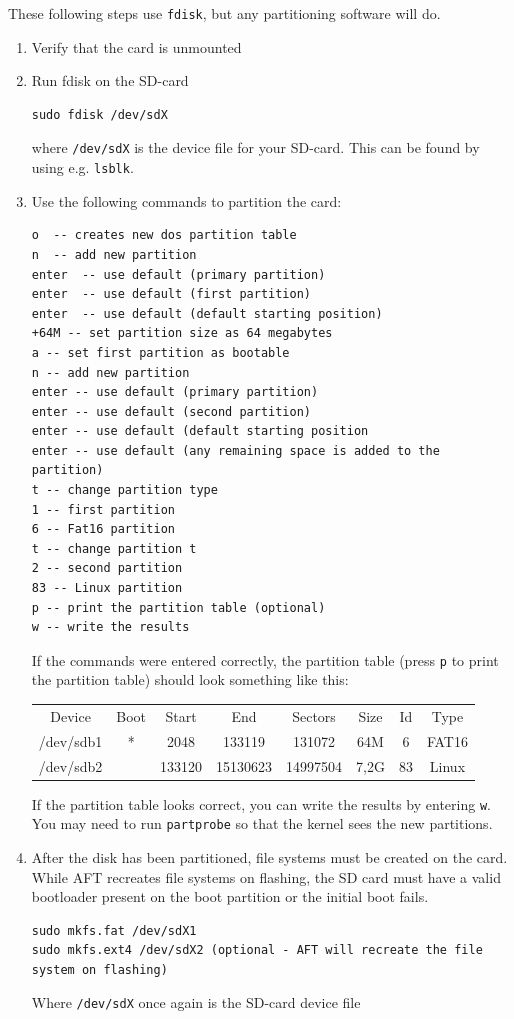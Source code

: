 \documentclass[a4paper,11pt]{article}
\newcommand{\cmd}[1]{\texttt{#1}}
\begin{document}
These following steps use \cmd{fdisk}, but any partitioning software will do.

\begin{enumerate}

\item Verify that the card is unmounted

\item Run fdisk on the SD-card

\begin{lstlisting}
sudo fdisk /dev/sdX
\end{lstlisting} 

where \cmd{/dev/sdX} is the device file for your SD-card. This can be found by using e.g. \cmd{lsblk}.

\item Use the following commands to partition the card:

\begin{lstlisting}
o  -- creates new dos partition table
n  -- add new partition
enter  -- use default (primary partition)
enter  -- use default (first partition)
enter  -- use default (default starting position)
+64M -- set partition size as 64 megabytes
a -- set first partition as bootable
n -- add new partition
enter -- use default (primary partition)
enter -- use default (second partition)
enter -- use default (default starting position
enter -- use default (any remaining space is added to the partition)
t -- change partition type
1 -- first partition 
6 -- Fat16 partition
t -- change partition t
2 -- second partition 
83 -- Linux partition
p -- print the partition table (optional)
w -- write the results
\end{lstlisting}

If the commands were entered correctly, the partition table (press \cmd{p} to print the partition table) should look something like this:

\begin{tabular}{c c c c c c c c}
Device & Boot & Start & End & Sectors & Size & Id & Type \\
/dev/sdb1  & * & 2048 & 133119 & 131072 & 64M & 6 & FAT16 \\
/dev/sdb2  &   & 133120 & 15130623 & 14997504 & 7,2G & 83 & Linux \\
\end{tabular}

If the partition table looks correct, you can write the results by entering \cmd{w}. You may need to run \cmd{partprobe} so that the kernel sees the new partitions.

\item After the disk has been partitioned, file systems must be created on the card. While AFT recreates file systems on flashing, the SD card must have a valid bootloader present on the boot partition or the initial boot fails. 

\begin{lstlisting}
sudo mkfs.fat /dev/sdX1
sudo mkfs.ext4 /dev/sdX2 (optional - AFT will recreate the file system on flashing)
\end{lstlisting}

Where \cmd{/dev/sdX} once again is the SD-card device file
\end{enumerate}
\end{document}
